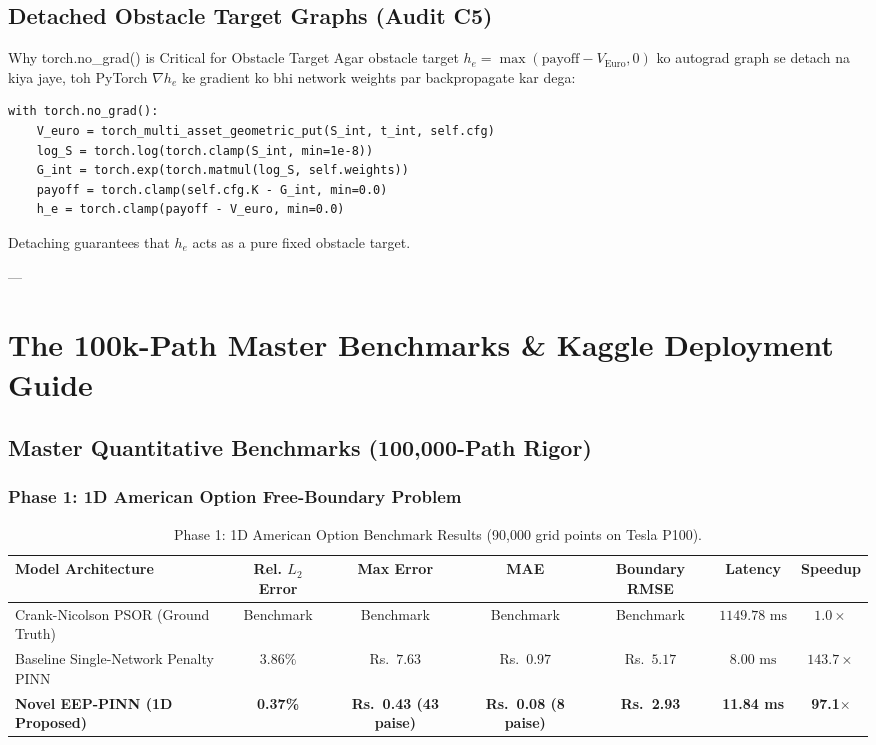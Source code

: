 \documentclass[11pt,a4paper,oneside]{book}
\begin{document}
\section{Detached Obstacle Target Graphs (Audit C5)}
\begin{codebox}{Why torch.no\_grad() is Critical for Obstacle Target}
Agar obstacle target $h_e = \max(\text{payoff} - V_{\text{Euro}}, 0)$ ko autograd graph se detach na kiya jaye, toh PyTorch $\nabla h_e$ ke gradient ko bhi network weights par backpropagate kar dega:
\begin{verbatim}
with torch.no_grad():
    V_euro = torch_multi_asset_geometric_put(S_int, t_int, self.cfg)
    log_S = torch.log(torch.clamp(S_int, min=1e-8))
    G_int = torch.exp(torch.matmul(log_S, self.weights))
    payoff = torch.clamp(self.cfg.K - G_int, min=0.0)
    h_e = torch.clamp(payoff - V_euro, min=0.0)
\end{verbatim}
Detaching guarantees that $h_e$ acts as a pure fixed obstacle target.
\end{codebox}

---

\chapter{The 100k-Path Master Benchmarks \& Kaggle Deployment Guide}

\section{Master Quantitative Benchmarks (100,000-Path Rigor)}

\subsection{Phase 1: 1D American Option Free-Boundary Problem}
\begin{table}[htbp]
\centering
\small
\caption{Phase 1: 1D American Option Benchmark Results (90,000 grid points on Tesla P100).}
\begin{tabularx}{\textwidth}{@{}l c c c c c c@{}}
\toprule
\textbf{Model Architecture} & \textbf{Rel. $L_2$ Error} & \textbf{Max Error} & \textbf{MAE} & \textbf{Boundary RMSE} & \textbf{Latency} & \textbf{Speedup} \\ \midrule
Crank-Nicolson PSOR (Ground Truth) & Benchmark & Benchmark & Benchmark & Benchmark & $1149.78\text{ ms}$ & $1.0\times$ \\
Baseline Single-Network Penalty PINN & $3.86\%$ & Rs.~$7.63$ & Rs.~$0.97$ & Rs.~$5.17$ & $8.00\text{ ms}$ & $143.7\times$ \\
\textbf{Novel EEP-PINN (1D Proposed)} & \textbf{0.37\%} & \textbf{Rs.~0.43 (43 paise)} & \textbf{Rs.~0.08 (8 paise)} & \textbf{Rs.~2.93} & \textbf{11.84 ms} & \textbf{97.1$\times$} \\ \bottomrule
\end{tabularx}
\end{table}
\end{document}
